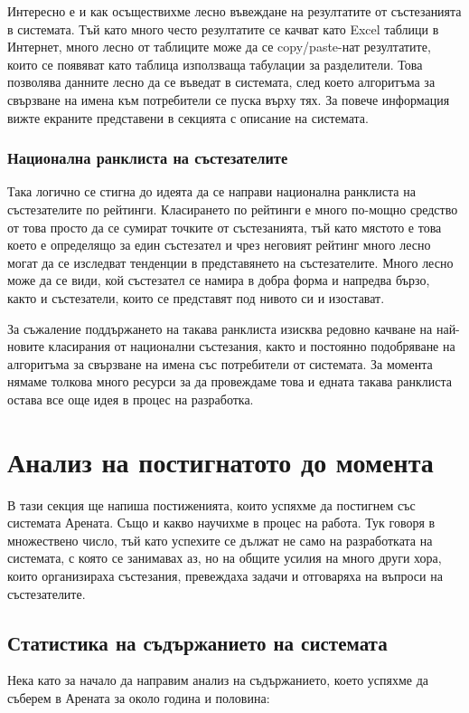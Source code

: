 \documentclass[a4paper,12pt]{article}
\begin{document}
    Интересно е и как осъществихме лесно въвеждане на резултатите от състезанията в системата. Тъй като много често резултатите се качват като Excel таблици в Интернет, много лесно от таблиците може да се copy/paste-нат резултатите, които се появяват като таблица използваща табулации за разделители. Това позволява данните лесно да се въведат в системата, след което алгоритъма за свързване на имена към потребители се пуска върху тях. За повече информация вижте екраните представени в секцията с описание на системата.

  \subsubsection{Национална ранклиста на състезателите}       
  Така логично се стигна до идеята да се направи национална ранклиста на състезателите по рейтинги. Класирането по рейтинги е много по-мощно средство от това просто да се сумират точките от състезанията, тъй като мястото е това което е определящо за един състезател и чрез неговият рейтинг много лесно могат да се изследват тенденции в представянето на състезателите. Много лесно може да се види, кой състезател се намира в добра форма и напредва бързо, както и състезатели, които се представят под нивото си и изостават.
  
  За съжаление поддържането на такава ранклиста изисква редовно качване на най-новите класирания от национални състезания, както и постоянно подобряване на алгоритъма за свързване на имена със потребители от системата. За момента нямаме толкова много ресурси за да провеждаме това и едната такава ранклиста остава все още идея в процес на разработка.

  \section{Анализ на постигнатото до момента}
  В тази секция ще напиша постиженията, които успяхме да постигнем със системата Арената. Също и какво научихме в процес на работа. Тук говоря в множествено число, тъй като успехите се дължат не само на разработката на системата, с която се занимавах аз, но на общите усилия на много други хора, които организираха състезания, превеждаха задачи и отговаряха на въпроси на състезателите.
  
  \subsection{Статистика на съдържанието на системата}
  Нека като за начало да направим анализ на съдържанието, което успяхме да съберем в Арената за около година и половина:
  
\end{document}
